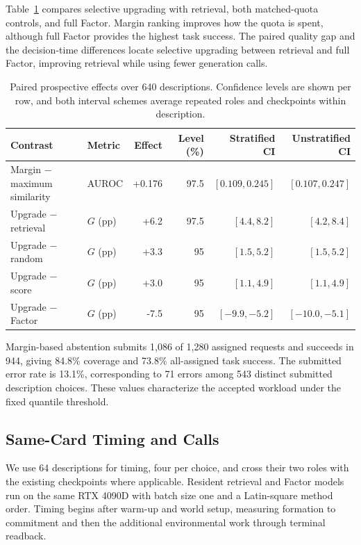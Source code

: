 \documentclass[sigconf,nonacm,balance=false]{aamas}
\newcommand{\tabstyle}{\small\setlength{\tabcolsep}{3pt}\renewcommand{\arraystretch}{1.10}}
\begin{document}
Table~\ref{tab:selection-effects-full} compares selective upgrading with retrieval, both matched-quota controls, and full Factor. Margin ranking improves how the quota is spent, although full Factor provides the highest task success. The paired quality gap and the decision-time differences locate selective upgrading between retrieval and full Factor, improving retrieval while using fewer generation calls.
\begin{table}[!htbp]
\centering\tabstyle
\caption{Paired prospective effects over 640 descriptions. Confidence levels are shown per row, and both interval schemes average repeated roles and checkpoints within description.}
\label{tab:selection-effects-full}
\begin{tabular}{@{}llrrrr@{}}
\toprule
\textbf{Contrast} & \textbf{Metric} & \textbf{Effect} & \textbf{Level} (\%) & \textbf{Stratified CI} & \textbf{Unstratified CI}\\
\midrule
Margin $-$ maximum similarity & AUROC & +0.176 & 97.5 & $[0.109,0.245]$ & $[0.107,0.247]$\\
Upgrade $-$ retrieval & $G$ (pp) & +6.2 & 97.5 & $[4.4,8.2]$ & $[4.2,8.4]$\\
Upgrade $-$ random & $G$ (pp) & +3.3 & 95 & $[1.5,5.2]$ & $[1.5,5.2]$\\
Upgrade $-$ score & $G$ (pp) & +3.0 & 95 & $[1.1,4.9]$ & $[1.1,4.9]$\\
Upgrade $-$ Factor & $G$ (pp) & -7.5 & 95 & $[-9.9,-5.2]$ & $[-10.0,-5.1]$\\
\bottomrule
\end{tabular}
\end{table}

Margin-based abstention submits 1,086 of 1,280 assigned requests and succeeds in 944, giving 84.8\% coverage and 73.8\% all-assigned task success. The submitted error rate is 13.1\%, corresponding to 71 errors among 543 distinct submitted description choices. These values characterize the accepted workload under the fixed quantile threshold.

\subsection{Same-Card Timing and Calls}
We use 64 descriptions for timing, four per choice, and cross their two roles with the existing checkpoints where applicable. Resident retrieval and Factor models run on the same RTX 4090D with batch size one and a Latin-square method order. Timing begins after warm-up and world setup, measuring formation to commitment and then the additional environmental work through terminal readback.
\end{document}
